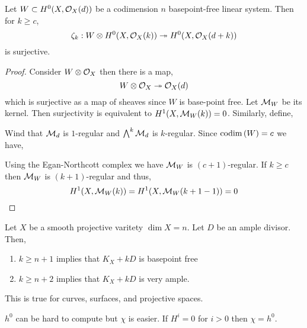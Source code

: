 \documentclass[12pt]{article}
\begin{document}
\begin{prop}
Let $W \subset H^0(X, \mathcal{O}_{X}(d))$ be a codimension $n$ basepoint-free linear system. Then for $k \ge c$,
\[ \zeta_k : W \otimes H^0(X, \mathcal{O}_{X}(k)) \twoheadrightarrow H^0(X, \mathcal{O}_{X}(d+k)) \]
is surjective. 
\end{prop}

\begin{proof}
Consider $W \otimes \mathcal{O}_{X}$ then there is a map,
\[ W \otimes \mathcal{O}_{X} \twoheadrightarrow \mathcal{O}_{X}(d) \]
which is surjective as a map of sheaves since $W$ is base-point free. Let $\mathcal{M}_W$ be its kernel. Then surjectivity is equivalent to $H^1(X, \mathcal{M}_W(k)) = 0$. Similarly, define,
\begin{center}
\end{center}
Wind that $\mathcal{M}_d$ is $1$-regular and $\bigwedge^k \mathcal{M}_d$ is $k$-regular. Since $\mathrm{codim}\left( W \right) = c$ we have,
\begin{center}
\end{center}
Using the Egan-Northcott complex we have $\mathcal{M}_W$ is $(c+1)$-regular. If $k \ge c$ then $\mathcal{M}_W$ is $(k+1)$-regular and thus,
\[ H^1(X, \mathcal{M}_W(k)) = H^1(X, \mathcal{M}_W(k+1-1)) = 0 \]
\end{proof}

\begin{conj}[Fujita]
Let $X$ be a smooth projective varitety $\dim{X} = n$. Let $D$ be an ample divisor. Then,
\begin{enumerate}
\item $k \ge n+1$ implies that $K_X + k D$ is basepoint free
\item $k \ge n+2$ implies that $K_X + k D$ is very ample.
\end{enumerate}
\end{conj}

\begin{rmk}
This is true for curves, surfaces, and projective spaces. 
\end{rmk}

\begin{rmk}
$h^0$ can be hard to compute but $\chi$ is easier. If $H^i = 0$ for $i > 0$ then $\chi = h^0$.
\end{rmk}
\end{document}

